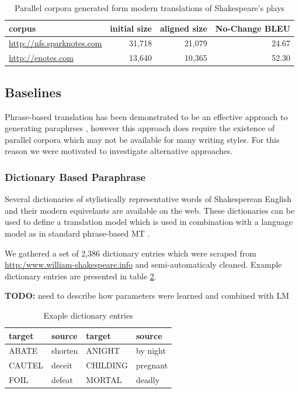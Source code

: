 \documentclass[10pt,a5paper,twoside]{article}
\begin{document}
\begin{table}
  \begin{center}
    \begin{tabular}{|l|r|r|r|}
      \hline
      corpus & initial size & aligned size & No-Change BLEU\\
      \hline
      \hline
      \url{http://nfs.sparknotes.com} & 31,718 & 21,079 & 24.67 \\
      \hline
      \url{http://enotes.com} & 13,640 & 10,365 & 52.30 \\
      \hline
    \end{tabular}
  \end{center}
  \caption{Parallel corpora generated form modern translations of Shakespeare's plays}
  \label{corpus_stats}
\end{table}

\subsection{Baselines}
Phrase-based translation has been demonstrated to be an effective approach to generating paraphrses \cite{chen11,quirk04}, however this approach does require the existence of
parallel corpora which may not be available for many writing styles.  For this reason we were motivated to investigate alternative approaches.

\subsubsection{Dictionary Based Paraphrase}
\label{dictionary_baseline}
Several dictionaries of stylistically representative words of Shakesperean English and their modern equivelants are available on the web.  These dictionaries can be used 
to define a translation model which is used in combination with a language model as in standard phrase-based MT \cite{Koehn00}.

We gathered a set of 2,386  dictionary entries which were scraped from \url{http:/www.william-shakespeare.info} and semi-automaticaly cleaned.  Example
dictionary entries are presented in table \ref{dictionary_example}.

{\bf TODO:} need to describe how parameters were learned and combined with LM

\begin{table}
  \begin{center}
  \begin{tabular}{|l|l||l|l|}
    \hline
    target & source & target & source \\
    \hline
    \hline
    ABATE & shorten & ANIGHT & by night \\
    \hline
    CAUTEL & deceit & CHILDING & pregnant \\
    \hline
    FOIL & defeat & MORTAL & deadly \\
    \hline
  \end{tabular}
  \end{center}
  \caption{Exaple dictionary entries}
  \label{dictionary_example}
\end{table}
\end{document}
